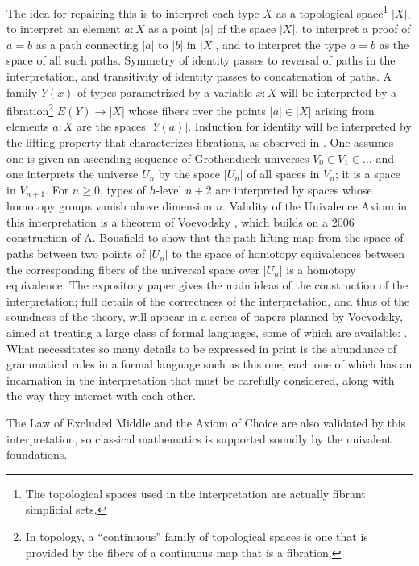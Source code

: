 \documentclass[letter,12pt]{amsart}
\theoremstyle{definition}
\theoremstyle{remark}
\numberwithin{equation}{section}
\begin{document}
The idea for repairing this is to interpret each type $X$ as a topological space\footnote{The topological spaces used in the interpretation are
  actually fibrant simplicial sets.} $|X|$, to interpret an element $a:X$ as a point $|a|$ of the space $|X|$, to interpret a proof of $a=b$ as
a path connecting $|a|$ to $|b|$ in $|X|$, and to interpret the type $a=b$ as the space of all such paths.  Symmetry of identity passes to
reversal of paths in the interpretation, and transitivity of identity passes to concatenation of paths.  A family $Y(x)$ of types parametrized
by a variable $x:X$ will be interpreted by a fibration\footnote{In topology, a ``continuous'' family of topological spaces is one that is provided
  by the fibers of a continuous map that is a fibration.} $E(Y)\to |X|$ whose fibers over the points $|a| \in |X|$ arising from elements
$a:X$ are the spaces $|Y(a)|$.  Induction for identity will be interpreted by the lifting property that characterizes fibrations, as observed in
\citep{0709.0248}.  One assumes one is given an ascending sequence of Grothendieck universes $V_0 \in V_1 \in \dots$ and one interprets the
universe $U_n$ by the space $|U_n|$ of all spaces in $V_n$; it is a space in $V_{n+1}$.  For $n \ge 0$, types of $h$-level $n+2$ are interpreted
by spaces whose homotopy groups vanish above dimension $n$.  Validity of the Univalence Axiom in this interpretation is a theorem of Voevodsky \citep{1203.2553},
which builds on a 2006 construction of A.{} Bousfield to show that the path lifting map from the space of paths between two
points of $|U_n|$ to the space of homotopy equivalences between the
corresponding fibers of the universal space over $|U_n|$ is a homotopy equivalence.  The expository paper \citep{1211.2851} gives the main ideas
of the construction of the interpretation; full details of the correctness of the interpretation, and thus of the soundness of the theory, will appear in a
series of papers planned by Voevodsky, aimed at treating a large class of formal languages, some of which are available: \citep{39, 42, 40, 104,
  103, 109, 110, 112, MR3607210, MR3607209}.  What necessitates so many details to be expressed in print is the abundance of grammatical rules
in a formal language such as this one, each one of which has an incarnation in the interpretation that must be carefully considered, along with
the way they interact with each other.

The Law of Excluded Middle and the Axiom of Choice are also validated by this interpretation, so classical mathematics is supported soundly by
the univalent foundations.
\end{document}
